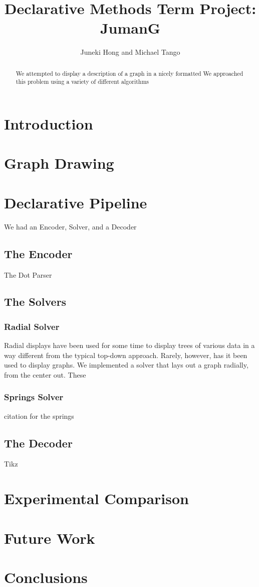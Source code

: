 \documentclass{article}
\title{Declarative Methods Term Project: \\ JumanG}
\author{Juneki Hong and Michael Tango}
\date{}
\begin{document}
\maketitle

\begin{abstract}
We attempted to display a description of a graph in a nicely formatted 
We approached this problem using a variety of different algorithms
\end{abstract}

\section{Introduction}

\section{Graph Drawing}


\section{Declarative Pipeline}

We had an Encoder, Solver, and a Decoder

\subsection{The Encoder}
The Dot Parser

\subsection{The Solvers}

\subsubsection{Radial Solver}
Radial displays have been used for some time to display trees of various data in a way different from the typical top-down approach.
Rarely, however, has it been used to display graphs. We implemented a solver that lays out a graph radially, from the center out.
These 

\subsubsection{Springs Solver}
citation for the springs\cite{springs}



\subsection{The Decoder}
Tikz


\section{Experimental Comparison}


\section{Future Work}


\section{Conclusions}



\end{document}
